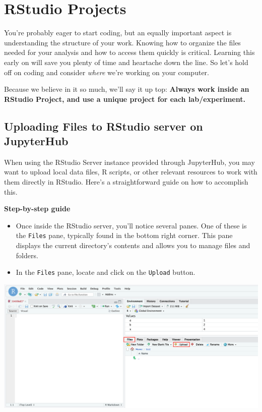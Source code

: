 \documentclass[
]{book}
\begin{document}
\hypertarget{rstudio-projects}{%
\chapter{RStudio Projects}\label{rstudio-projects}}

You're probably eager to start coding, but an equally important aspect is understanding the structure of your work. Knowing how to organize the files needed for your analysis and how to access them quickly is critical. Learning this early on will save you plenty of time and heartache down the line. So let's hold off on coding and consider \emph{where} we're working on your computer.

Because we believe in it so much, we'll say it up top: \textbf{Always work inside an RStudio Project, and use a unique project for each lab/experiment.}

\hypertarget{uploading-files-to-rstudio-server-on-jupyterhub}{%
\section{Uploading Files to RStudio server on JupyterHub}\label{uploading-files-to-rstudio-server-on-jupyterhub}}

When using the RStudio Server instance provided through JupyterHub, you may want to upload local data files, R scripts, or other relevant resources to work with them directly in RStudio. Here's a straightforward guide on how to accomplish this.

\textbf{Step-by-step guide}

\begin{itemize}
\item
  Once inside the RStudio server, you'll notice several panes. One of these is the \texttt{Files} pane, typically found in the bottom right corner. This pane displays the current directory's contents and allows you to manage files and folders.
\item
  In the \texttt{Files} pane, locate and click on the \texttt{Upload} button.
\end{itemize}

\includegraphics{images/upload_rstudio1.png}
\end{document}
